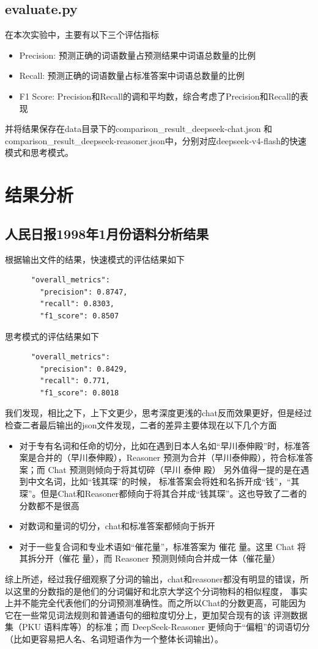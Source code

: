 \documentclass[11pt]{article}
\begin{document}
\subsection{evaluate.py}
在本次实验中，主要有以下三个评估指标
\begin{itemize}
    \item Precision: 预测正确的词语数量占预测结果中词语总数量的比例
    \item Recall: 预测正确的词语数量占标准答案中词语总数量的比例
    \item F1 Score: Precision和Recall的调和平均数，综合考虑了Precision和Recall的表现
\end{itemize}
并将结果保存在data目录下的comparison\_result\_deepseek-chat.json
和comparison\_result\_deepseek-reasoner.json中，分别对应deepseek-v4-flash的快速模式和思考模式。

\section{结果分析}
\subsection{人民日报1998年1月份语料分析结果}
根据输出文件的结果，快速模式的评估结果如下
\begin{lstlisting}
      "overall_metrics": 
        "precision": 0.8747,
        "recall": 0.8303,
        "f1_score": 0.8507
\end{lstlisting}
思考模式的评估结果如下
\begin{lstlisting}
      "overall_metrics": 
        "precision": 0.8429,
        "recall": 0.771,
        "f1_score": 0.8018
\end{lstlisting}
我们发现，相比之下，上下文更少，思考深度更浅的chat反而效果更好，但是经过检查二者最后输出的json文件发现，二者的差异主要体现在以下几个方面
\begin{itemize}
    \item 对于专有名词和任命的切分，比如在遇到日本人名如“早川泰伸殿”时，标准答案是合并的（早川泰伸殿），Reasoner 预测为合并（早川泰伸殿），符合标准答案；而 Chat 预测则倾向于将其切碎（早川 泰伸 殿）
    另外值得一提的是在遇到中文名词，比如“钱其琛”的时候， 标准答案会将姓和名拆开成“钱”，“其琛”。但是Chat和Reasoner都倾向于将其合并成“钱其琛”。这也导致了二者的分数都不是很高
    \item 对数词和量词的切分，chat和标准答案都倾向于拆开
    \item 对于一些复合词和专业术语如“催花量”，标准答案为 催花 量。这里 Chat 将其拆分开（催花 量），而 Reasoner 预测则倾向合并成一体（催花量）
\end{itemize}
综上所述，经过我仔细观察了分词的输出，chat和reasoner都没有明显的错误，所以这里的分数指的是他们的分词偏好和北京大学这个分词物料的相似程度，
事实上并不能完全代表他们的分词预测准确性。而之所以Chat的分数更高，可能因为它在一些常见词法规则和普通语句的细粒度切分上，更加契合现有的该
评测数据集（PKU 语料库等）的标准；而 DeepSeek-Reasoner 更倾向于“偏粗”的词语切分（比如更容易把人名、名词短语作为一个整体长词输出）。
\end{document}
